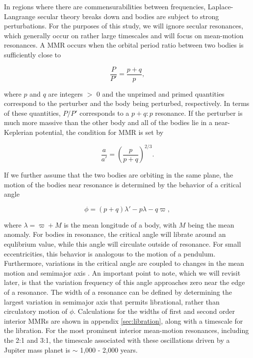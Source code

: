 \documentclass[fleqn,usenatbib]{mnras}
\begin{document}
In regions where there are commensurabilities between frequencies, Laplace-Langrange secular theory breaks down and bodies are subject to strong 
perturbations. For the purposes of this study, we will ignore secular resonances, which generally occur on rather large timescales and will focus on 
mean-motion resonances. A MMR occurs  when the orbital period ratio between two bodies is sufficiently close to

\begin{equation}\label{eq:per_mmr}
	\frac{P}{P'} = \frac{p + q}{p},
\end{equation}

\noindent where  $p$ and $q$ are integers $>$ 0 and the unprimed and primed quantities correspond to the perturber and the body being perturbed, 
respectively. In terms of these quantities, $P/P'$ corresponds to a $p+q:p$ resonance. If the perturber is much more massive than the other body and all of the 
bodies lie in a near-Keplerian potential, the condition for MMR is set by

\begin{equation}\label{eq:a_mmr}
	\frac{a}{a'} = \left( \frac{p}{p + q} \right)^{2/3}.
\end{equation}

If we further assume that the two bodies are orbiting in the same plane, the motion of the bodies near resonance is determined by the
behavior of a critical angle

\begin{equation}\label{eq:phi_crit}
	\phi = (p + q) \lambda' - p \lambda - q \varpi,
\end{equation}

\noindent where $\lambda = \varpi + M$ is the mean longitude of a
body, with $M$ being the mean anomaly. For bodies in resonance, the critical angle will librate around an 
equlibrium value, while this angle will circulate outside of resonance. For small eccentricities, this behavior is analogous to the motion of a 
pendulum. Furthermore, variations in the critical angle are coupled to changes in the mean motion and semimajor axis \citep{1999ssd..book.....M}. An important 
point to note, which we will revisit later, is that the variation frequency of this angle approaches zero near the edge of a resonance. The 
width of a resonance can be defined by determining the largest variation in semimajor axis that permits librational, rather than circulatory motion of $\phi$. 
Calculations for the widths of first and second order interior MMRs are shown in appendix \ref{sec:libration}, along with a timescale for the libration. For the most prominent interior 
mean-motion resonances, including the 2:1 and 3:1, the timescale associated with these oscillations driven by a Jupiter mass planet is  $\sim$ 1,000 - 2,000 years.
\end{document}
